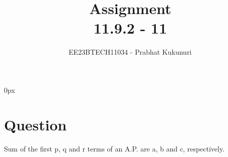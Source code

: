 \documentclass[journal,12pt,twocolumn]{IEEEtran}
\theoremstyle{remark}
\begin{document}
\parindent 0px


\vspace{3cm}

\title{Assignment\\[1ex]11.9.2 - 11}
\author{EE23BTECH11034 - Prabhat Kukunuri$^{}$%
}
\maketitle
\newpage
\bigskip

\renewcommand{\thefigure}{\theenumi}
\renewcommand{\thetable}{\theenumi}
\section*{Question}
Sum of the first p, q and r terms of an A.P. are a, b and c, respectively.
\end{document}
